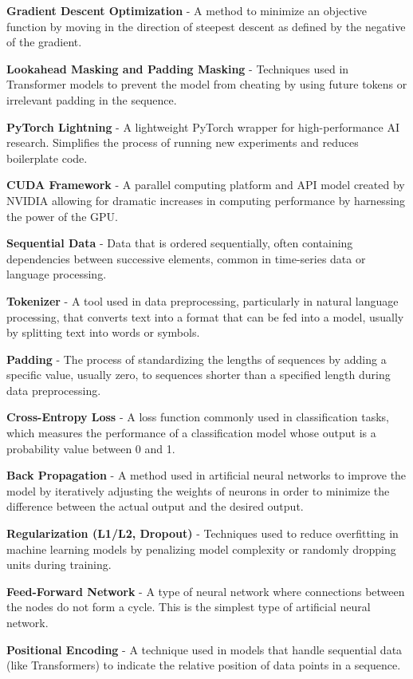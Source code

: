 \documentclass[preprint,11pt,review,authoryear]{elsarticle}
\begin{document}
\textbf{Gradient Descent Optimization} - A method to minimize an objective function by moving in the direction of steepest descent as defined by the negative of the gradient.

\textbf{Lookahead Masking and Padding Masking} - Techniques used in Transformer models to prevent the model from cheating by using future tokens or irrelevant padding in the sequence.

\textbf{PyTorch Lightning} - A lightweight PyTorch wrapper for high-performance AI research. Simplifies the process of running new experiments and reduces boilerplate code.

\textbf{CUDA Framework} - A parallel computing platform and API model created by NVIDIA allowing for dramatic increases in computing performance by harnessing the power of the GPU.

\textbf{Sequential Data} - Data that is ordered sequentially, often containing dependencies between successive elements, common in time-series data or language processing.

\textbf{Tokenizer} - A tool used in data preprocessing, particularly in natural language processing, that converts text into a format that can be fed into a model, usually by splitting text into words or symbols.

\textbf{Padding} - The process of standardizing the lengths of sequences by adding a specific value, usually zero, to sequences shorter than a specified length during data preprocessing.

\textbf{Cross-Entropy Loss} - A loss function commonly used in classification tasks, which measures the performance of a classification model whose output is a probability value between 0 and 1.

\textbf{Back Propagation} - A method used in artificial neural networks to improve the model by iteratively adjusting the weights of neurons in order to minimize the difference between the actual output and the desired output.

\textbf{Regularization (L1/L2, Dropout)} - Techniques used to reduce overfitting in machine learning models by penalizing model complexity or randomly dropping units during training.

\textbf{Feed-Forward Network} - A type of neural network where connections between the nodes do not form a cycle. This is the simplest type of artificial neural network.

\textbf{Positional Encoding} - A technique used in models that handle sequential data (like Transformers) to indicate the relative position of data points in a sequence.
\end{document}
